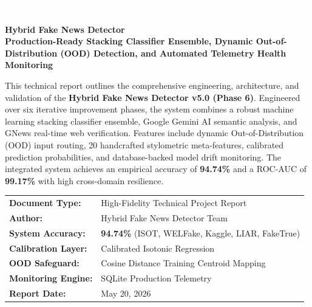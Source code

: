 \documentclass[11pt,a4paper,oneside]{article}
\begin{document}
\begin{titlepage}
    \centering
    \vspace*{2.0cm}
    
    \begin{tcolorbox}[colback=primary, colframe=primary, halign=center, width=2.5cm, height=2.5cm, arc=10pt]
        \vspace*{0.25cm}
        \textcolor{white}{\Huge\bfseries 🔍}
    \end{tcolorbox}
    
    \vspace{0.8cm}
    {\Huge\bfseries Hybrid Fake News Detector}\\[0.4cm]
    {\large\textcolor{secondary}{\bfseries Production-Ready Stacking Classifier Ensemble, Dynamic Out-of-Distribution (OOD) Detection, and Automated Telemetry Health Monitoring}}\\[1.5cm]
    
    \begin{tcolorbox}[colback=lightbg, colframe=secondary, title=\textbf{Executive Core Summary}, coltitle=white, colbacktitle=secondary]
        This technical report outlines the comprehensive engineering, architecture, and validation of the \textbf{Hybrid Fake News Detector v5.0 (Phase 6)}. Engineered over six iterative improvement phases, the system combines a robust machine learning stacking classifier ensemble, Google Gemini AI semantic analysis, and GNews real-time web verification. Features include dynamic Out-of-Distribution (OOD) input routing, 20 handcrafted stylometric meta-features, calibrated prediction probabilities, and database-backed model drift monitoring. The integrated system achieves an empirical accuracy of \textbf{94.74\%} and a ROC-AUC of \textbf{99.17\%} with high cross-domain resilience.
    \end{tcolorbox}
    
    \vfill
    
    \begin{tabular}{ll}
        \textbf{Document Type:} & High-Fidelity Technical Project Report \\
        \textbf{Author:} & Hybrid Fake News Detector Team \\
        \textbf{System Accuracy:} & \textbf{94.74\%} (ISOT, WELFake, Kaggle, LIAR, FakeTrue) \\
        \textbf{Calibration Layer:} & Calibrated Isotonic Regression \\
        \textbf{OOD Safeguard:} & Cosine Distance Training Centroid Mapping \\
        \textbf{Monitoring Engine:} & SQLite Production Telemetry \\
        \textbf{Report Date:} & May 20, 2026
    \end{tabular}
    

\end{titlepage}
\end{document}
